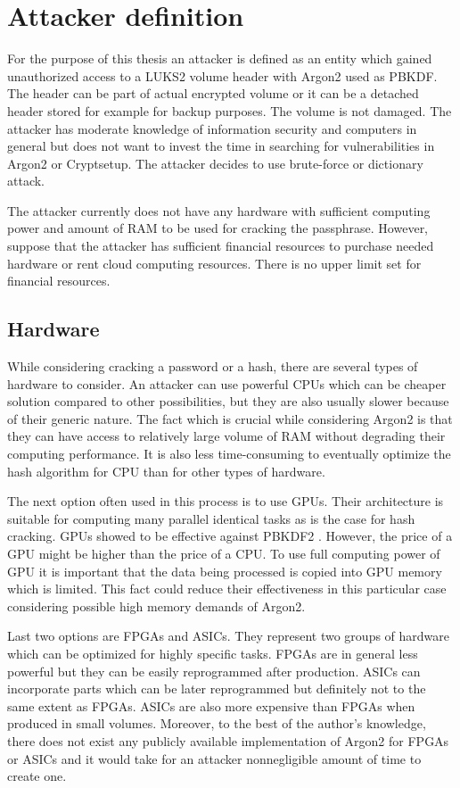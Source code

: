 \documentclass[nolof]{fithesis3}
\begin{document}
\section{Attacker definition}
\label{sec:attacker}
For the purpose of this thesis an attacker is defined as an entity which gained unauthorized access to a LUKS2 volume header with Argon2 used as PBKDF. The header can be part of actual encrypted volume or it can be a detached header stored for example for backup purposes. The volume is not damaged. The attacker has moderate knowledge of information security and computers in general but does not want to invest the time in searching for vulnerabilities in Argon2 or Cryptsetup. The attacker decides to use brute-force or dictionary attack.

The attacker currently does not have any hardware with sufficient computing power and amount of RAM to be used for cracking the passphrase. However, suppose that the attacker has sufficient financial resources to purchase needed hardware or rent cloud computing resources. There is no upper limit set for financial resources.

\subsection{Hardware}
While considering cracking a password or a hash, there are several types of hardware to consider. An attacker can use powerful CPUs which can be cheaper solution compared to other possibilities, but they are also usually slower because of their generic nature. The fact which is crucial while considering Argon2 is that they can have access to relatively large volume of RAM without degrading their computing performance. It is also less time-consuming to eventually optimize the hash algorithm for CPU than for other types of hardware.

The next option often used in this process is to use GPUs. Their architecture is suitable for computing many parallel identical tasks as is the case for hash cracking. GPUs showed to be effective against PBKDF2 \parencite{mosnacek}. However, the price of a GPU might be higher than the price of a CPU. To use full computing power of GPU it is important that the data being processed is copied into GPU memory which is limited. This fact could reduce their effectiveness in this particular case considering possible high memory demands of Argon2.

Last two options are FPGAs and ASICs. They represent two groups of hardware which can be optimized for highly specific tasks. FPGAs are in general less powerful but they can be easily reprogrammed after production. ASICs can incorporate parts which can be later reprogrammed but definitely not to the same extent as FPGAs. ASICs are also more expensive than FPGAs when produced in small volumes. Moreover, to the best of the author's knowledge, there does not exist any publicly available implementation of Argon2 for FPGAs or ASICs and it would take for an attacker nonnegligible amount of time to create one.
\end{document}
